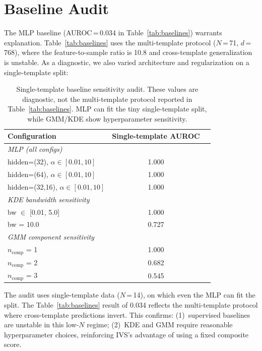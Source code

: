 \documentclass{article}
\begin{document}
\section{Baseline Audit}
\label{app:baseline_audit}

The MLP baseline (AUROC\,=\,0.034 in Table~\ref{tab:baselines}) warrants explanation. Table~\ref{tab:baselines} uses the multi-template protocol ($N$\,=\,71, $d$\,=\,768), where the feature-to-sample ratio is 10.8 and cross-template generalization is unstable. As a diagnostic, we also varied architecture and regularization on a single-template split:

\begin{table}[h]
\caption{Single-template baseline sensitivity audit. These values are diagnostic, not the multi-template protocol reported in Table~\ref{tab:baselines}. MLP can fit the tiny single-template split, while GMM/KDE show hyperparameter sensitivity.}
\begin{center}\small
\begin{tabular}{lcc}
\toprule
\textbf{Configuration} & \textbf{Single-template AUROC} \\
\midrule
\multicolumn{2}{l}{\textit{MLP (all configs)}} \\
\quad hidden=(32), $\alpha \in [0.01, 10]$ & 1.000 \\
\quad hidden=(64), $\alpha \in [0.01, 10]$ & 1.000 \\
\quad hidden=(32,16), $\alpha \in [0.01, 10]$ & 1.000 \\
\midrule
\multicolumn{2}{l}{\textit{KDE bandwidth sensitivity}} \\
\quad bw $\in$ [0.01, 5.0] & 1.000 \\
\quad bw = 10.0 & 0.727 \\
\midrule
\multicolumn{2}{l}{\textit{GMM component sensitivity}} \\
\quad $n_\text{comp}$ = 1 & 1.000 \\
\quad $n_\text{comp}$ = 2 & 0.682 \\
\quad $n_\text{comp}$ = 3 & 0.545 \\
\bottomrule
\end{tabular}
\end{center}
\end{table}

The audit uses single-template data ($N$\,=\,14), on which even the MLP can fit the split. The Table~\ref{tab:baselines} result of 0.034 reflects the multi-template protocol where cross-template predictions invert. This confirms: (1)~supervised baselines are unstable in this low-$N$ regime; (2)~KDE and GMM require reasonable hyperparameter choices, reinforcing IVS's advantage of using a fixed composite score.
\end{document}
